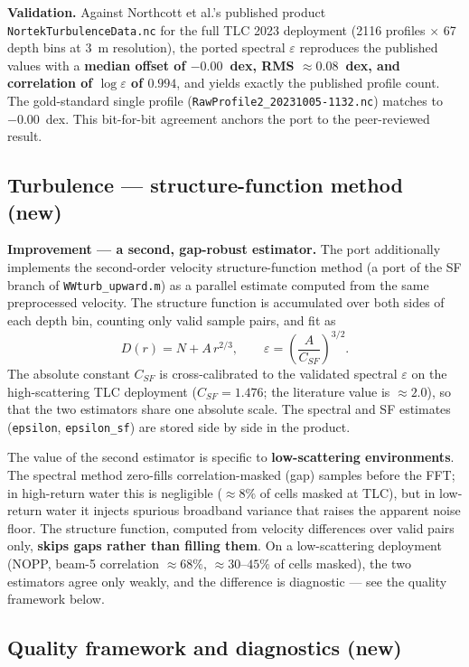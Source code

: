 \documentclass[11pt]{article}
\newcommand{\code}[1]{\texttt{#1}}
\newcommand{\eps}{\varepsilon}
\begin{document}
\textbf{Validation.} Against Northcott et al.'s published product
\code{NortekTurbulenceData.nc} for the full TLC 2023 deployment (2116 profiles $\times$ 67
depth bins at 3~m resolution), the ported spectral $\eps$ reproduces the published values with
a \textbf{median offset of $-0.00$~dex, RMS $\approx 0.08$~dex, and correlation of
$\log\eps$ of $0.994$}, and yields exactly the published profile count. The gold-standard
single profile (\code{RawProfile2\_20231005-1132.nc}) matches to $-0.00$~dex. This
bit-for-bit agreement anchors the port to the peer-reviewed result.

\subsection{Turbulence --- structure-function method (new)}

\textbf{Improvement --- a second, gap-robust estimator.} The port additionally implements the
second-order velocity structure-function method (a port of the SF branch of
\code{WWturb\_upward.m}) as a parallel estimate computed from the same preprocessed velocity.
The structure function is accumulated over both sides of each depth bin, counting only valid
sample pairs, and fit as
\begin{equation}
D(r) = N + A\,r^{2/3}, \qquad
\eps = \left(\frac{A}{C_{SF}}\right)^{3/2}.
\end{equation}
The absolute constant $C_{SF}$ is cross-calibrated to the validated spectral $\eps$ on the
high-scattering TLC deployment ($C_{SF} = 1.476$; the literature value is $\approx 2.0$), so
that the two estimators share one absolute scale. The spectral and SF estimates
(\code{epsilon}, \code{epsilon\_sf}) are stored side by side in the product.

The value of the second estimator is specific to \textbf{low-scattering environments}. The
spectral method zero-fills correlation-masked (gap) samples before the FFT; in high-return
water this is negligible ($\approx 8\%$ of cells masked at TLC), but in low-return water it
injects spurious broadband variance that raises the apparent noise floor. The structure
function, computed from velocity differences over valid pairs only, \textbf{skips gaps rather
than filling them}. On a low-scattering deployment (NOPP, beam-5 correlation $\approx 68\%$,
$\approx 30$--$45\%$ of cells masked), the two estimators agree only weakly, and the difference
is diagnostic --- see the quality framework below.

\subsection{Quality framework and diagnostics (new)}
\label{sec:qc}
\end{document}
